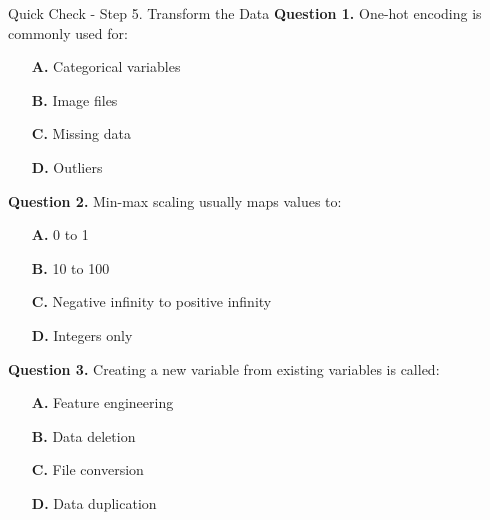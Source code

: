 \documentclass[aspectratio=169,11pt]{beamer}
\begin{document}
\begin{frame}[allowframebreaks]{Quick Check - Step 5. Transform the Data}
\footnotesize
\textbf{Question 1.} One-hot encoding is commonly used for:\par\medskip
\begin{itemize}
\item[\textbf{A.}] Categorical variables
\item[\textbf{B.}] Image files
\item[\textbf{C.}] Missing data
\item[\textbf{D.}] Outliers
\end{itemize}
\textbf{Question 2.} Min-max scaling usually maps values to:\par\medskip
\begin{itemize}
\item[\textbf{A.}] 0 to 1
\item[\textbf{B.}] 10 to 100
\item[\textbf{C.}] Negative infinity to positive infinity
\item[\textbf{D.}] Integers only
\end{itemize}
\textbf{Question 3.} Creating a new variable from existing variables is called:\par\medskip
\begin{itemize}
\item[\textbf{A.}] Feature engineering
\item[\textbf{B.}] Data deletion
\item[\textbf{C.}] File conversion
\item[\textbf{D.}] Data duplication
\end{itemize}
\end{frame}
\end{document}
